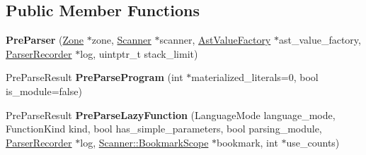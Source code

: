 \subsection*{Public Member Functions}
\begin{DoxyCompactItemize}
\item 
{\bfseries Pre\+Parser} (\hyperlink{classv8_1_1internal_1_1_zone}{Zone} $\ast$zone, \hyperlink{classv8_1_1internal_1_1_scanner}{Scanner} $\ast$scanner, \hyperlink{classv8_1_1internal_1_1_ast_value_factory}{Ast\+Value\+Factory} $\ast$ast\+\_\+value\+\_\+factory, \hyperlink{classv8_1_1internal_1_1_parser_recorder}{Parser\+Recorder} $\ast$log, uintptr\+\_\+t stack\+\_\+limit)\hypertarget{classv8_1_1internal_1_1_pre_parser_af15c92cddd9bd8d9d4155701ee017a34}{}\label{classv8_1_1internal_1_1_pre_parser_af15c92cddd9bd8d9d4155701ee017a34}

\item 
Pre\+Parse\+Result {\bfseries Pre\+Parse\+Program} (int $\ast$materialized\+\_\+literals=0, bool is\+\_\+module=false)\hypertarget{classv8_1_1internal_1_1_pre_parser_ab95cd7046d972c8f658e3b27e28ce5d3}{}\label{classv8_1_1internal_1_1_pre_parser_ab95cd7046d972c8f658e3b27e28ce5d3}

\item 
Pre\+Parse\+Result {\bfseries Pre\+Parse\+Lazy\+Function} (Language\+Mode language\+\_\+mode, Function\+Kind kind, bool has\+\_\+simple\+\_\+parameters, bool parsing\+\_\+module, \hyperlink{classv8_1_1internal_1_1_parser_recorder}{Parser\+Recorder} $\ast$log, \hyperlink{classv8_1_1internal_1_1_scanner_1_1_bookmark_scope}{Scanner\+::\+Bookmark\+Scope} $\ast$bookmark, int $\ast$use\+\_\+counts)\hypertarget{classv8_1_1internal_1_1_pre_parser_a40e159fbfbdec22ee7f7cf726402a5b0}{}\label{classv8_1_1internal_1_1_pre_parser_a40e159fbfbdec22ee7f7cf726402a5b0}

\end{DoxyCompactItemize}
